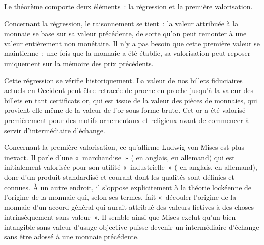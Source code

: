 Le théorème comporte deux éléments~: la régression et la première valorisation.


Concernant la régression, le raisonnement se tient~: la valeur attribuée à la monnaie se base sur sa valeur précédente, de sorte qu'on peut remonter à une valeur entièrement non monétaire. Il n'y a pas besoin que cette première valeur se maintienne~: une fois que la monnaie a été établie, sa valorisation peut reposer uniquement sur la mémoire des prix précédents. 

Cette régression se vérifie historiquement. La valeur de nos billets fiduciaires actuels en Occident peut être retracée de proche en proche jusqu'à la valeur des billets en tant certificats or, qui est issue de la valeur des pièces de monnaies, qui provient elle-même de la valeur de l'or sous forme brute. Cet or a été valorisé premièrement pour des motifs ornementaux et religieux avant de commencer à servir d'intermédiaire d'échange.


Concernant la première valorisation, ce qu'affirme Ludwig von Mises est plus inexact. Il parle d'une «~marchandise~» ( en anglais,  en allemand) qui est initialement valorisée pour son utilité «~industrielle~» ( en anglais,  en allemand), donc d'un produit standardisé et courant dont les qualités sont définies et connues. À un autre endroit, il s'oppose explicitement à la théorie lockéenne de l'origine de la monnaie qui, selon ses termes, fait «~découler l'origine de la monnaie d'un accord général qui aurait attribué des valeurs fictives à des choses intrinsèquement sans valeur~». Il semble ainsi que Mises exclut qu'un bien intangible sans valeur d'usage objective puisse devenir un intermédiaire d'échange sans être adossé à une monnaie précédente.

